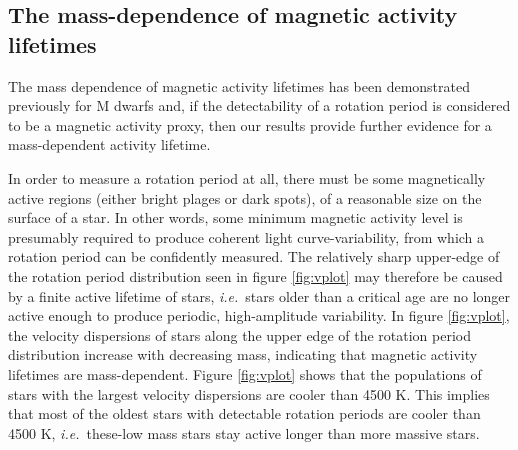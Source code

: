\documentclass{aastex63}
\newcommand{\ie}{{\it i.e.}}
\newcommand{\eg}{{\it e.g.}}
\newcommand{\kepler}{{\it Kepler}}
\newcommand{\racomment}[1]{{\color{blue}#1}}
\begin{document}
\racomment{

\subsection{The mass-dependence of magnetic activity lifetimes}
\label{sec:activity}

The mass dependence of magnetic activity lifetimes has been demonstrated
previously \racomment{for M dwarfs} \citep[\eg][]{west2008, newton2017,
kiman2019} and, if the detectability of a rotation period is considered to be
a magnetic activity proxy, then our results provide further evidence for a
mass-dependent activity lifetime.

In order to measure a rotation period at all, there must be some magnetically
active regions (either bright plages or dark spots), of a reasonable size on
the surface of a star.
In other words, some minimum magnetic activity level is presumably required to
produce coherent light curve-variability, from which a rotation period can be
confidently measured.
The relatively sharp upper-edge of the rotation period distribution seen in
figure \ref{fig:vplot} may therefore be caused by a finite active lifetime of
stars, \ie\ stars older than a critical age are no longer active enough to
produce periodic, high-amplitude variability.
In figure \ref{fig:vplot}, the velocity dispersions of stars along the upper
edge of the rotation period distribution increase with decreasing mass,
indicating that magnetic activity lifetimes are mass-dependent.
Figure \ref{fig:vplot} shows that the populations of stars with the largest
velocity dispersions are cooler than 4500 K.
This implies that most of the oldest stars with detectable rotation periods
are cooler than 4500 K, \ie\ these-low mass stars stay active longer than more
massive stars.
}
\end{document}
